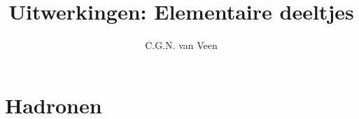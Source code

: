 
\usepackage{enumitem}
\usepackage{hepnames}
\usepackage[version=3]{mhchem}



\title{Uitwerkingen: Elementaire deeltjes}
\author{C.G.N. van Veen}



\maketitle

\section{Hadronen}
